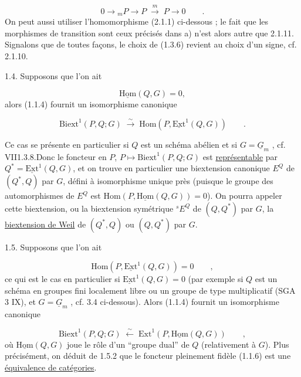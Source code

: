 \begin{equation*}
0 \longrightarrow {}_mP \longrightarrow P \;\stackrel{m}{\longrightarrow}\; P \longrightarrow 0 \qquad .
\end{equation*}
On peut aussi utiliser l'homomorphisme (2.1.1) ci-dessous ; le fait que les morphismes de transition sont ceux précisés dans a) n'est alors autre que 2.1.11. Signalons que de toutes façons, le choix de (1.3.6) revient au choix d'un signe, cf. 2.1.10.

1.4.  Supposons que l'on ait

\begin{equation}\tag{1.4.1}
\underline{\mathrm{Hom}}(Q,G) = 0,
\end{equation}
alors (1.1.4) fournit un isomorphisme canonique

\begin{equation}\tag{1.4.2}
\mathrm{Biext}^1(P,Q;G) \;\stackrel{\sim}{\longrightarrow}\; \mathrm{Hom}(P, \underline{\mathrm{Ext}}^1(Q,G)) \qquad .
\end{equation}


Ce cas se présente en particulier si $Q$ est un schéma abélien et si $G = \underline{G}_m$ , cf. VII1.3.8.Donc le foncteur en $P$, $P \longmapsto \mathrm{Biext}^1(P,Q;G)$ est \underline{représentable} par $Q^* = \underline{\mathrm{Ext}}^1(Q,G)$, et on trouve en particulier une biextension canonique $E^Q$ de $(Q^*,Q)$ par $G$, défini à isomorphisme unique près (puisque le groupe des automorphismes de $E^Q$ est $\mathrm{Hom}(P,\underline{\mathrm{Hom}}(Q,G)) = 0$). On pourra appeler cette biextension, ou la biextension symétrique ${}^sE^Q$ de $(Q,Q^*)$ par $G$, la \underline{biextension de Weil} de $(Q^*,Q)$ ou $(Q,Q^*)$ par $G$.

1.5.  Supposons que l'on ait

\begin{equation}\tag{1.5.1}
\mathrm{Hom}(P, \underline{\mathrm{Ext}}^1(Q,G)) = 0 \qquad ,
\end{equation}
ce qui est le cas en particulier si $\underline{\mathrm{Ext}}^1(Q,G) = 0$ (par exemple si $Q$ est un schéma en groupes fini localement libre ou un groupe de type multiplicatif (SGA 3 IX), et $G = \underline{G}_m$ , cf. 3.4 ci-dessous). Alors (1.1.4) fournit un isomorphisme canonique

\begin{equation}\tag{1.5.2}
\mathrm{Biext}^1(P,Q; G) \;\stackrel{\sim}{\longleftarrow}\; \mathrm{Ext}^1(P,\underline{\mathrm{Hom}}(Q,G)) \qquad ,
\end{equation}
où $\underline{\mathrm{Hom}}(Q,G)$ joue le rôle d'un ``groupe dual'' de $Q$ (relativement à $G$). Plus précisément, on déduit de 1.5.2 que le foncteur pleinement fidèle (1.1.6) est une \underline{équivalence de catégories}.

